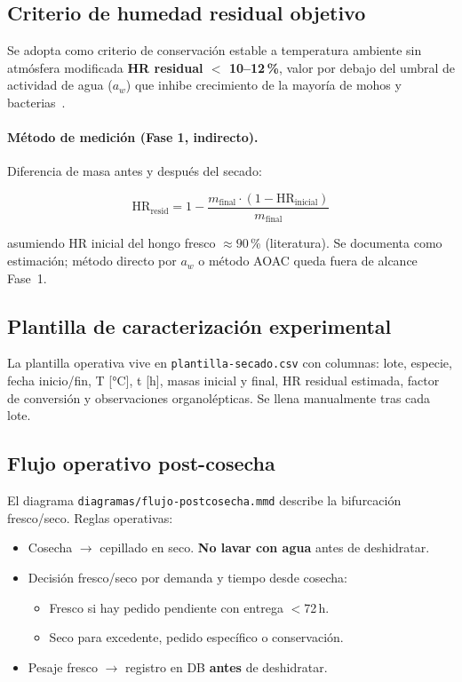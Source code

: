 \subsection{Criterio de humedad residual objetivo}
\label{sec:postcosecha:hr_residual}

Se adopta como criterio de conservación estable a temperatura ambiente
sin atmósfera modificada \textbf{HR residual $<$ 10--12\,\%}, valor por
debajo del umbral de actividad de agua ($a_w$) que inhibe crecimiento
de la mayoría de mohos y bacterias~\cite{chang2004}.

\paragraph{Método de medición (Fase 1, indirecto).} Diferencia de masa
antes y después del secado:

\begin{equation}
  \text{HR}_{\text{resid}} = 1 -
    \frac{m_{\text{final}} \cdot (1 - \text{HR}_{\text{inicial}})}{m_{\text{final}}}
\end{equation}

\noindent asumiendo HR inicial del hongo fresco $\approx 90$\,\%
(literatura). Se documenta como estimación; método directo por $a_w$
o método AOAC queda fuera de alcance Fase~1.

\subsection{Plantilla de caracterización experimental}
\label{sec:postcosecha:plantilla}

La plantilla operativa vive en \texttt{plantilla-secado.csv} con
columnas: lote, especie, fecha inicio/fin, T [\si{\celsius}], t [h],
masas inicial y final, HR residual estimada, factor de conversión y
observaciones organolépticas. Se llena manualmente tras cada lote.

\subsection{Flujo operativo post-cosecha}
\label{sec:postcosecha:flujo}

El diagrama \texttt{diagramas/flujo-postcosecha.mmd} describe la
bifurcación fresco/seco. Reglas operativas:

\begin{itemize}[leftmargin=*,itemsep=0pt]
  \item Cosecha $\to$ cepillado en seco. \textbf{No lavar con agua}
        antes de deshidratar.
  \item Decisión fresco/seco por demanda y tiempo desde cosecha:
    \begin{itemize}
      \item Fresco si hay pedido pendiente con entrega $<$72\,h.
      \item Seco para excedente, pedido específico o conservación.
    \end{itemize}
  \item Pesaje fresco $\to$ registro en DB \textbf{antes} de
        deshidratar.
\end{itemize}


